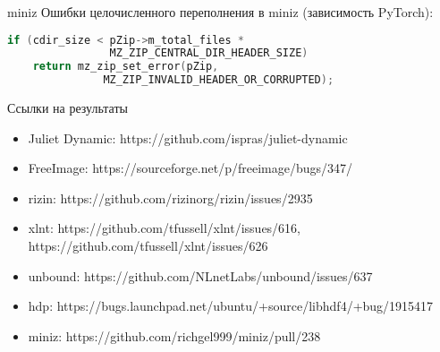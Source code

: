 \documentclass[10pt]{beamer}
\begin{document}
\begin{frame}[fragile]{miniz}
Ошибки целочисленного переполнения в miniz (зависимость PyTorch):
\begin{lstlisting}[language=C, basicstyle=\small\ttfamily,
                   xleftmargin=2em,
                   captionpos=b,
                   label=lst:miniz-overflow]
if (cdir_size < pZip->m_total_files *
                MZ_ZIP_CENTRAL_DIR_HEADER_SIZE)
    return mz_zip_set_error(pZip,
               MZ_ZIP_INVALID_HEADER_OR_CORRUPTED);
\end{lstlisting}
\end{frame}

\begin{frame}{Ссылки на результаты}
\begin{itemize}
    \item Juliet Dynamic: https://github.com/ispras/juliet-dynamic
    \item FreeImage: https://sourceforge.net/p/freeimage/bugs/347/
    \item rizin: https://github.com/rizinorg/rizin/issues/2935
    \item xlnt: https://github.com/tfussell/xlnt/issues/616,
        https://github.com/tfussell/xlnt/issues/626
    \item unbound: https://github.com/NLnetLabs/unbound/issues/637
    \item hdp: https://bugs.launchpad.net/ubuntu/+source/libhdf4/+bug/1915417
    \item miniz: https://github.com/richgel999/miniz/pull/238
\end{itemize}
\end{frame}
\end{document}
